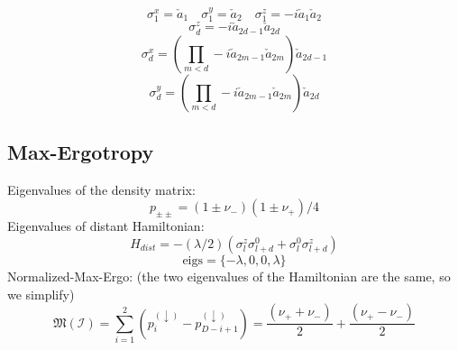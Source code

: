 \documentclass[12pt,a4paper]{book}
\theoremstyle{definition}
\begin{document}
\begin{equation}
	\sigma_1^x=\check{a}_1  \quad
	\sigma_1^y=\check{a}_2  \quad
	\sigma_1^z=-i\check{a}_1\check{a}_2
\end{equation}
\begin{equation}
	\sigma_{d}^{z} = -i\check{a}_{2d-1} \check{a}_{2 d} 
\end{equation}
\begin{equation}
	\sigma_{d}^{x}=
	\left(\prod_{m<d} -i\check{a}_{2m-1} \check{a}_{2 m}\right)\check{a}_{2d-1}
\end{equation}
\begin{equation}
	\sigma_{d}^{y}=
	\left(\prod_{m<d} -i\check{a}_{2m-1} \check{a}_{2 m}\right)\check{a}_{2d}
\end{equation}
\subsection{Max-Ergotropy}

Eigenvalues of the density matrix:
\begin{equation}
	p_{\pm \pm } =(1 \pm \nu_-)(1 \pm \nu_+)/4
\end{equation}
Eigenvalues of distant Hamiltonian:
\begin{equation}
	H_{dist}=-(\lambda/2)(\sigma^z_l\sigma^0_{l+d} +\sigma^0_l\sigma^z_{l+d})
\end{equation}
\begin{equation}
	\text{eigs}= \{-\lambda,0,0 ,\lambda \}
\end{equation}
Normalized-Max-Ergo: (the two eigenvalues of the Hamiltonian are the same, so we simplify)
\begin{equation}
	\mathfrak{M}(\mathcal{I}) =	  \sum_{i=1}^ {2}\left(p_{i}^{(\downarrow)}-p_{D-i+1}^{(\downarrow)}\right) =	\frac{(\nu_+ + \nu_-)}{2}+\frac{(\nu_+-\nu_-)} {2}
\end{equation}

\clearpage
\end{document}
